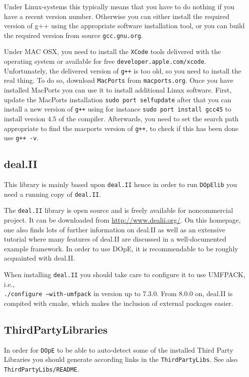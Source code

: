 Under Linux-systems this typically means that you have to do nothing if you have a recent 
version number. Otherwise you can either install the required version of g++ using the 
appropriate software installation tool, or you can build the required version from 
source \texttt{gcc.gnu.org}.

Under MAC OSX, you need to install the \texttt{XCode} tools delivered with the operating system 
or available for free \texttt{developer.apple.com/xcode}. Unfortunately, the delivered 
version of \texttt{g++} is too old, so you need to install the real thing. To do so, 
download \texttt{MacPorts} from \texttt{macports.org}. Once you have installed MacPorts 
you can use it to install additional Linux software. 
First, update the MacPorts installation \texttt{sudo port selfupdate}
after that you can install a new version of \texttt{g++} using for instance 
\texttt{sudo port install gcc45} to install version $4.5$ of the compiler.
Afterwards, you need to set the search path appropriate to find the macports version
of \texttt{g++}, to check if this has been done use \texttt{g++ -v}.

\subsection{deal.II}
This library is mainly based upon \texttt{deal.II} hence in order to run 
\texttt{DOpElib} you need a running copy of \texttt{deal.II}.

The \texttt{deal.II} library is open source and is freely available for noncommercial project.
It can be downloaded from \url{http://www.dealii.org/}. On this
homepage, one also finds lots of further information on deal.II as well as
an extensive tutorial where many features of deal.II are discussed in a
well-documented example framework. In order to use DOpE, it is
recommendable to be roughly acquainted with deal.II.

When installing \texttt{deal.II} you should take care to configure 
it to use UMFPACK, i.e.,\\
\texttt{./configure --with-umfpack}
in version up to 7.3.0. From 8.0.0 on, deal.II is compited with 
cmake, which makes the inclusion of external packages easier.

\subsection{ThirdPartyLibraries}
In order for \texttt{DOpE} to be able to auto-detect some of the installed 
Third Party Libraries you should generate according links in the 
\texttt{ThirdPartyLibs}. See also \texttt{ThirdPartyLibs/README}.

